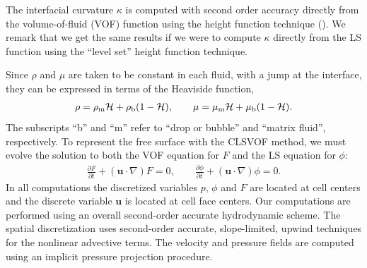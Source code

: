 \documentclass{elsarticle}
\newcommand{\Hea}{\mathcal{H}}
\newcommand{\vv}{\mathbf}
\newcommand{\bmu}{\vv{u}}
\begin{document}
The interfacial curvature $\kappa$ is
computed with second order accuracy directly from the volume-of-fluid (VOF)
function using the height function technique (\citet{Sus03,SusSmiHusOhtZhi07}).  
We remark that we get the same
results if we were to compute $\kappa$ directly from the LS function using the
``level set'' height function technique.

Since $\rho$ and $\mu$ are taken to be constant in each fluid, with a jump at
the interface, they can be expressed in terms of the Heaviside function,
%
\begin{eqnarray}\label{rhomu}
  \rho=\rho_{\rm m}\Hea+\rho_{\rm b}(1-\Hea), \qquad 
  \mu=\mu_{\rm m}\Hea+\mu_{\rm b}(1-\Hea).
\end{eqnarray}
%
The subscripts ``b'' and ``m'' refer to ``drop or bubble'' and ``matrix
fluid'', respectively. To represent the free surface with the CLSVOF method, we
must evolve the solution to both the VOF equation for $F$ and the LS equation
for $\phi$:
%
\begin{align}\label{eq:clsvof}
  \frac{\partial F}{\partial t}+(\bmu\cdot\nabla)F = 0, \qquad 
  \frac{\partial \phi}{\partial t}+(\bmu\cdot\nabla)\phi = 0. 
\end{align}
%
In all computations the discretized variables $p$, $\phi$ and $F$ are located at
cell centers and the discrete variable $\bmu$ is located at cell face centers.
Our computations are performed using an overall second-order accurate
hydrodynamic scheme.  The spatial discretization uses second-order accurate,
slope-limited, upwind techniques for the nonlinear advective terms.  The
velocity and pressure fields are computed using an implicit pressure projection
procedure. 
\end{document}
